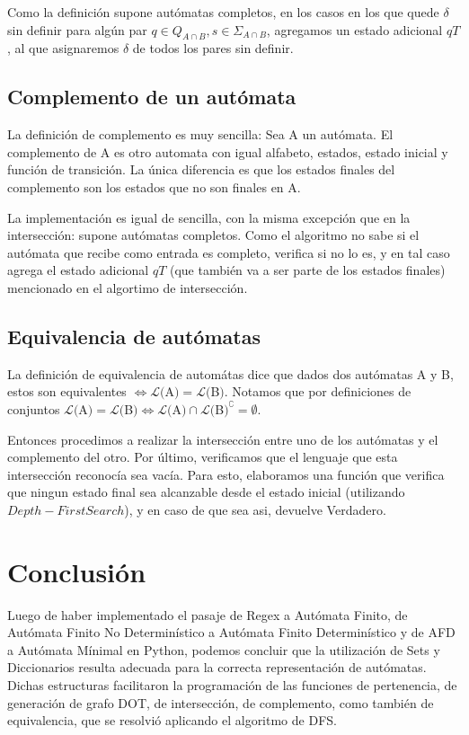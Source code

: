 \documentclass[a4paper, 10pt, twoside]{article}
\begin{document}
Como la definición supone autómatas completos, en los casos en los que quede $\delta$ sin definir para algún par $q \in Q_{A \cap B}, s \in \Sigma_{A \cap B}$, agregamos un estado adicional $qT$, al que asignaremos $\delta$ de todos los pares sin definir.

\subsection{Complemento de un autómata}

La definición de complemento es muy sencilla: Sea A un autómata. El complemento de A es otro automata con igual alfabeto, estados, estado inicial y función de transición. La única diferencia es que los estados finales del complemento son los estados que no son finales en A.

La implementación es igual de sencilla, con la misma excepción que en la intersección: supone autómatas completos. Como el algoritmo no sabe si el autómata que recibe como entrada es completo, verifica si no lo es, y en tal caso agrega el estado adicional $qT$ (que también va a ser parte de los estados finales) mencionado en el algortimo de intersección.

\subsection{Equivalencia de autómatas}

La definición de equivalencia de automátas dice que dados dos autómatas A y B, estos son equivalentes $\Leftrightarrow \mathcal{L}($A$) = \mathcal{L}($B$)$. Notamos que por definiciones de conjuntos $\mathcal{L}($A$) = \mathcal{L}($B$) \Leftrightarrow \mathcal{L}($A$) \cap \mathcal{L}($B$)^\complement = \emptyset$.

Entonces procedimos a realizar la intersección entre uno de los autómatas y el complemento del otro.
Por último, verificamos que el lenguaje que esta intersección reconocía sea vacía. Para esto, elaboramos una función que verifica que ningun estado final sea alcanzable desde el estado inicial (utilizando $Depth-First Search$), y en caso de que sea asi, devuelve Verdadero.

\newpage
\section{Conclusión}
Luego de haber implementado el pasaje de Regex a Autómata Finito, de Autómata Finito No Determinístico a Autómata Finito Determinístico y de AFD a Autómata Mínimal en Python, podemos concluir que la utilización de Sets y Diccionarios resulta adecuada para la correcta representación de autómatas. Dichas estructuras facilitaron la programación de las funciones de pertenencia, de generación de grafo DOT, de intersección, de complemento, como también de equivalencia, que se resolvió aplicando el algoritmo de DFS.
\end{document}
